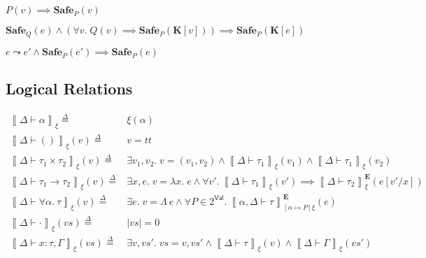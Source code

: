\documentclass{article}
\newcommand{\TT}{\mathit{tt}}
\newcommand{\VAL}{\mathsf{Val}}
\newcommand{\UNT}{()}
\newcommand{\ectx}{\mathbf{K}}
\newcommand{\defeq}{\overset{\Delta}{=}}
\newcommand{\pred}{P}
\newcommand{\predB}{Q}
\newcommand{\semtyp}[3]{\left\llbracket #2 \vdash #3 \right\rrbracket_{#1}}
\newcommand{\semErel}[1]{#1^{\textbf{E}}}
\newcommand{\semenv}{\xi}
\newcommand{\TLam}{\Lambda}
\newcommand{\Tctx}{\Gamma}
\newcommand{\CtxTps}{\Delta}
\newcommand{\expr}{e}
\newcommand{\val}{v}
\newcommand{\var}{x}
\newcommand{\typ}{\tau}
\newcommand{\tvar}{\alpha}
\newcommand{\step}{\leadsto}
\newcommand{\Safe}[1]{\textbf{Safe}_{#1}}
\begin{document}
\begin{safevallemma}
  \makeatletter{}\makeatother
  \label{lem:safeval}
  $\pred(\val) \implies \Safe{\pred}(\val)$
\end{safevallemma}

\begin{safebindlemma}
  \makeatletter{}\makeatother
  \label{lem:safebind}
  $\Safe{\predB}(\expr) \land (\forall \val.\; \predB(\val) \implies \Safe{\pred}(\ectx[\val])) \implies \Safe{\pred}(\ectx[\expr])$
\end{safebindlemma}
\begin{safesteplemma}
  \makeatletter{}\makeatother
  \label{lem:safestep}
  $\expr \step \expr' \land \Safe{\pred}(\expr') \implies \Safe{\pred}(\expr)$
\end{safesteplemma}

\subsection*{Logical Relations}
\begin{align*}
\semtyp{\semenv}{\CtxTps}{\tvar} \defeq{}& \semenv(\tvar)\\
\semtyp{\semenv}{\CtxTps}{\UNT}(\val) \defeq{}& v = \TT\\
\semtyp{\semenv}{\CtxTps}{\typ_1 \times \typ_2}(\val) \defeq{}& \exists \val_1, \val_2.\; \val = (\val_1, \val_2) \land
\semtyp{\semenv}{\CtxTps}{\typ_1}(\val_1) \land \semtyp{\semenv}{\CtxTps}{\typ_1}(\val_2)\\
\semtyp{\semenv}{\CtxTps}{\typ_1 \to \typ_2}(\val) \defeq{}& \exists \var, \expr.\; \val = \lambda \var.\; \expr \land
\forall \val'.~\semtyp{\semenv}{\CtxTps}{\typ_1}(\val') \implies \semErel{\semtyp{\semenv}{\CtxTps}{\typ_2}}(\expr[\val'/\var])\\
\semtyp{\semenv}{\CtxTps}{\forall \tvar.~\typ}(\val) \defeq{}& \exists \expr.\; \val = \TLam~\expr\land
\forall \pred \in 2^{\VAL}.~\semErel{\semtyp{[\tvar \mapsto \pred]\semenv}{\tvar, \CtxTps}{\typ}}(\expr)\\[0.5em]
\semtyp{\semenv}{\CtxTps}{\cdot}(\mathit{vs}) \defeq{}& |\mathit{vs}| = 0\\
\semtyp{\semenv}{\CtxTps}{\var : \typ, \Tctx}(\mathit{vs}) \defeq{}& \exists \val, \mathit{vs'}.\; \mathit{vs} = \val, \mathit{vs'} \land \semtyp{\semenv}{\CtxTps}{\typ}(\val) \land \semtyp{\semenv}{\CtxTps}{\Tctx}(\mathit{vs'})\\
\end{align*}
\end{document}
